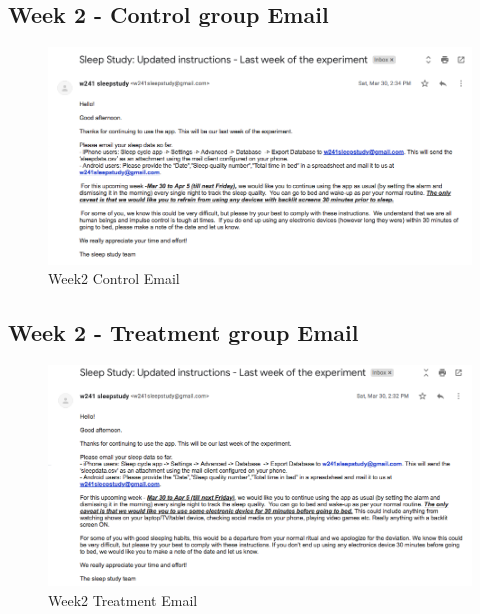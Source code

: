\documentclass[12pt,]{article}
\begin{document}
\hypertarget{week-2---control-group-email}{%
\subsection{Week 2 - Control group
Email}\label{week-2---control-group-email}}

\begin{figure}[H]

{\centering \includegraphics[width=1\linewidth]{img/week2_control} 

}

\caption{Week2 Control Email}\label{fig:unnamed-chunk-11}
\end{figure}

\hypertarget{week-2---treatment-group-email}{%
\subsection{Week 2 - Treatment group
Email}\label{week-2---treatment-group-email}}

\begin{figure}[H]

{\centering \includegraphics[width=1\linewidth]{img/week2_treatment} 

}

\caption{Week2 Treatment Email}\label{fig:unnamed-chunk-12}
\end{figure}
\end{document}
